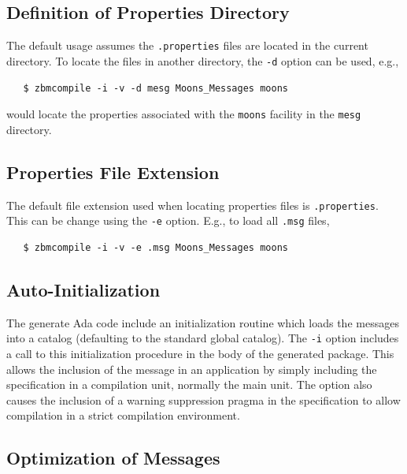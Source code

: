 \subsection{Definition of Properties Directory}

The default usage assumes the \texttt{.properties} files are located
in the current directory.   To locate the files in another directory,
the \verb|-d| option can be used, e.g.,
\begin{xmpl}
\begin{verbatim}
   $ zbmcompile -i -v -d mesg Moons_Messages moons
\end{verbatim}
\end{xmpl}
would locate the properties associated with the \verb|moons| facility
in the \verb|mesg| directory.

\subsection{Properties File Extension}

The default file extension used when locating properties files is
\texttt{.properties}.  This can be change using the \verb|-e| option.
E.g., to load all \texttt{.msg} files,
\begin{xmpl}
\begin{verbatim}
   $ zbmcompile -i -v -e .msg Moons_Messages moons
\end{verbatim}
\end{xmpl}

\subsection{Auto-Initialization}

The generate Ada code include an initialization routine which loads
the messages into a catalog (defaulting to the standard global
catalog).  The \verb|-i| option includes a call to this initialization
procedure in the body of the generated package.  This allows the
inclusion of the message in an application by simply including the
specification in a compilation unit, normally the main unit.  The
option also causes the inclusion of a warning suppression pragma
in the specification to allow compilation in a strict compilation
environment.

\subsection{Optimization of Messages}

